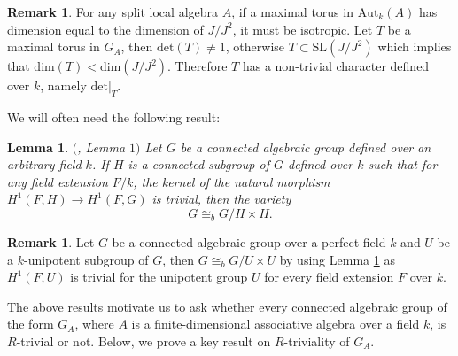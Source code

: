 \documentclass[12pt]{amsart}
\newtheorem{lemma}[theorem]{Lemma}
\theoremstyle{definition}
\newtheorem{remark}[theorem]{Remark}
\numberwithin{equation}{section}
\begin{document}
\vskip2mm

\begin{remark}\label{Remark 4.17}
For any split local algebra $A$, if a maximal torus in $\text{Aut}_k(A)$ has dimension equal to the dimension of $J/J^2$, it must be isotropic. Let $T$ be a maximal torus in $G_A$, then $\text{det}(T)\neq 1$, otherwise $T\subset \text{SL}(J/J^2)$ which implies that $\text{dim}(T)<\text{dim}(J/J^2)$. Therefore $T$ has a non-trivial character defined over $k$, namely $\text{det}|_{T}$.
\end{remark}

\vspace{0.2in}
\noindent
We will often need the following result:
\vskip2mm
\begin{lemma}\label{Lemma 4.18}
$($\cite{CP}, \emph{Lemma} $1)$ Let $G$ be a connected algebraic group defined over an arbitrary field $k$. If $H$ is a connected subgroup of $G$ defined over $k$ such that for any field extension $F/k$, the kernel of the natural morphism $H^1(F,H)\rightarrow H^1(F,G)$ is trivial, then the variety 
\begin{equation*}\label{eq9}
G\cong_{b} G/H \times H.\end{equation*}
\end{lemma}
\vskip2mm
\begin{remark}\label{Remark 4.19}
Let $G$ be a connected algebraic group over a perfect field $k$ and $U$ be a $k$-unipotent subgroup of $G$, then $G\cong_b G/U\times U$ by using Lemma \ref{Lemma 4.18} as $H^{1}(F, U)$ is trivial for the unipotent group $U$ for every field extension $F$ over $k$.  
\end{remark}
\vspace{0.2in}

\noindent
The above results motivate us to ask whether every connected algebraic group of the form $G_A$, where $A$ is a finite-dimensional associative algebra over a field $k$, is $R$-trivial or not. Below, we prove a key result on $R$-triviality of $G_A$.
\end{document}
